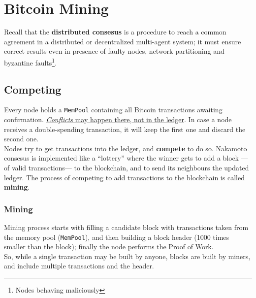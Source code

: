 \chapter{Bitcoin Mining}

Recall that the \textbf{distributed consesus} is a procedure to reach a common agreement in a distributed or decentralized multi-agent system;
it must ensure correct results even in presence of faulty nodes, network partitioning and byzantine faults\footnote{Nodes behaving maliciously}.

\section{Competing}
Every node holds a \texttt{MemPool} containing all Bitcoin transactions awaiting confirmation.
\ul{\textit{Conflicts} may happen there, not in the ledger}.
In case a node receives a double-spending transaction, it will keep the first one and discard the second one.\\
Nodes try to get transactions into the ledger, and \textbf{compete} to do so.
Nakamoto consesus is implemented like a ``lottery'' where the winner gets to add a block ---of valid transactions--- to the blockchain, and to send its neighbours the updated ledger. The process of competing to add transactions to the blockchain is called \textbf{mining}.

\subsection{Mining}
Mining process starts with filling a candidate block with transactions taken
from the memory pool (\texttt{MemPool}), and then building a block header (1000 times smaller than the block);
finally the node performs the Proof of Work.\\
So, while a single transaction may be built by anyone, blocks are built by miners, and include multiple transactions and the header.

